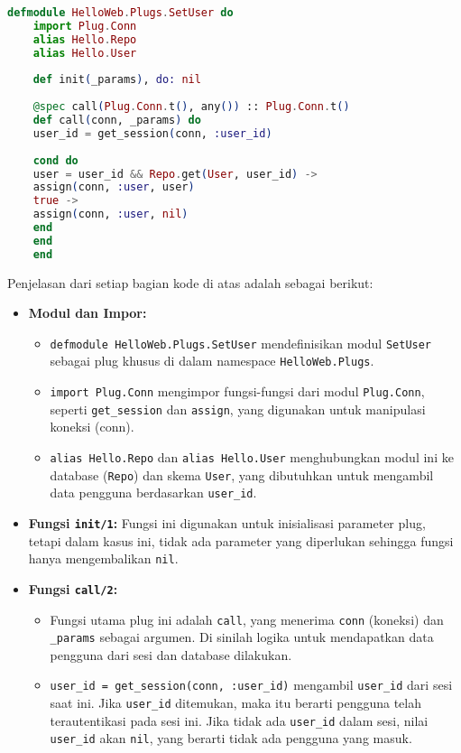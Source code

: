 \begin{lstlisting}[language=Elixir, caption={\texttt{lib/hello\_web/plugs/set\_user.ex}}]
	defmodule HelloWeb.Plugs.SetUser do
	import Plug.Conn
	alias Hello.Repo
	alias Hello.User
	
	def init(_params), do: nil
	
	@spec call(Plug.Conn.t(), any()) :: Plug.Conn.t()
	def call(conn, _params) do
	user_id = get_session(conn, :user_id)
	
	cond do
	user = user_id && Repo.get(User, user_id) ->
	assign(conn, :user, user)
	true ->
	assign(conn, :user, nil)
	end
	end
	end
\end{lstlisting}

Penjelasan dari setiap bagian kode di atas adalah sebagai berikut:

\begin{itemize}
	\item \textbf{Modul dan Impor:} 
	\begin{itemize}
		\item \texttt{defmodule HelloWeb.Plugs.SetUser} mendefinisikan modul \texttt{SetUser} sebagai plug khusus di dalam namespace \texttt{HelloWeb.Plugs}.
		\item \texttt{import Plug.Conn} mengimpor fungsi-fungsi dari modul \texttt{Plug.Conn}, seperti \texttt{get\_session} dan \texttt{assign}, yang digunakan untuk manipulasi koneksi (conn).
		\item \texttt{alias Hello.Repo} dan \texttt{alias Hello.User} menghubungkan modul ini ke database (\texttt{Repo}) dan skema \texttt{User}, yang dibutuhkan untuk mengambil data pengguna berdasarkan \texttt{user\_id}.
	\end{itemize}
	
	\item \textbf{Fungsi \texttt{init/1}:} Fungsi ini digunakan untuk inisialisasi parameter plug, tetapi dalam kasus ini, tidak ada parameter yang diperlukan sehingga fungsi hanya mengembalikan \texttt{nil}.
	
	\item \textbf{Fungsi \texttt{call/2}:} 
	\begin{itemize}
		\item Fungsi utama plug ini adalah \texttt{call}, yang menerima \texttt{conn} (koneksi) dan \texttt{\_params} sebagai argumen. Di sinilah logika untuk mendapatkan data pengguna dari sesi dan database dilakukan.
		\item \texttt{user\_id = get\_session(conn, :user\_id)} mengambil \texttt{user\_id} dari sesi saat ini. Jika \texttt{user\_id} ditemukan, maka itu berarti pengguna telah terautentikasi pada sesi ini. Jika tidak ada \texttt{user\_id} dalam sesi, nilai \texttt{user\_id} akan \texttt{nil}, yang berarti tidak ada pengguna yang masuk.
	\end{itemize}
	

\end{itemize}
